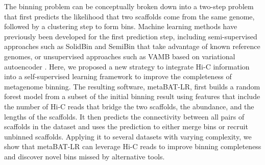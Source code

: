 \documentclass[fleqn,10pt,lineno]{wlpeerj}
\begin{document}
The binning problem can be conceptually broken down into a two-step problem that first predicts the likelihood that two scaffolds come from the same genome, followed by a clustering step to form bins. Machine learning methods have previously been developed for the first prediction step, including semi-supervised approaches such as SolidBin \citep{wang2019solidbin} and SemiBin \citep{pan2022deep} that take advantage of known reference genomes, or unsupervised approaches such as VAMB based on variational autoencoder \citep{nissen2021improved}. 
Here, we proposed a new strategy to integrate Hi-C information into a self-supervised learning framework to improve the completeness of metagenome binning. The resulting software, metaBAT-LR, first builds a random forest model from a subset of the initial binning result using features that include the number of Hi-C reads that bridge the two scaffolds, the abundance, and the lengths of the scaffolds. It then predicts the connectivity between all pairs of scaffolds in the dataset and uses the prediction to either merge bins or recruit unbinned scaffolds. Applying it to several datasets with varying complexity, we show that metaBAT-LR can leverage Hi-C reads to improve binning completeness and discover novel bins missed by alternative tools.  
\end{document}
